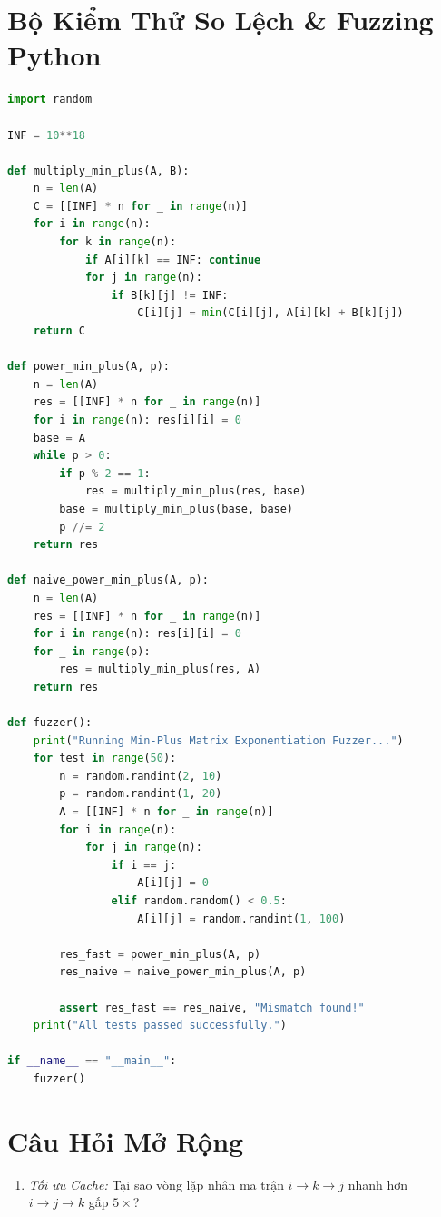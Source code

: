 \documentclass[11pt, letterpaper]{report}
\begin{document}
\section{Bộ Kiểm Thử So Lệch \& Fuzzing Python}
\begin{lstlisting}[language=Python, caption={Python Matrix Multiplication Stress Test}]
import random

INF = 10**18

def multiply_min_plus(A, B):
    n = len(A)
    C = [[INF] * n for _ in range(n)]
    for i in range(n):
        for k in range(n):
            if A[i][k] == INF: continue
            for j in range(n):
                if B[k][j] != INF:
                    C[i][j] = min(C[i][j], A[i][k] + B[k][j])
    return C

def power_min_plus(A, p):
    n = len(A)
    res = [[INF] * n for _ in range(n)]
    for i in range(n): res[i][i] = 0
    base = A
    while p > 0:
        if p % 2 == 1:
            res = multiply_min_plus(res, base)
        base = multiply_min_plus(base, base)
        p //= 2
    return res

def naive_power_min_plus(A, p):
    n = len(A)
    res = [[INF] * n for _ in range(n)]
    for i in range(n): res[i][i] = 0
    for _ in range(p):
        res = multiply_min_plus(res, A)
    return res

def fuzzer():
    print("Running Min-Plus Matrix Exponentiation Fuzzer...")
    for test in range(50):
        n = random.randint(2, 10)
        p = random.randint(1, 20)
        A = [[INF] * n for _ in range(n)]
        for i in range(n):
            for j in range(n):
                if i == j:
                    A[i][j] = 0
                elif random.random() < 0.5:
                    A[i][j] = random.randint(1, 100)
        
        res_fast = power_min_plus(A, p)
        res_naive = naive_power_min_plus(A, p)
        
        assert res_fast == res_naive, "Mismatch found!"
    print("All tests passed successfully.")

if __name__ == "__main__":
    fuzzer()
\end{lstlisting}

\section{Câu Hỏi Mở Rộng}
\begin{enumerate}
 \item \textit{Tối ưu Cache:} Tại sao vòng lặp nhân ma trận $i \to k \to j$ nhanh hơn $i \to j \to k$ gấp $5\times$?
\end{enumerate}
\end{document}
